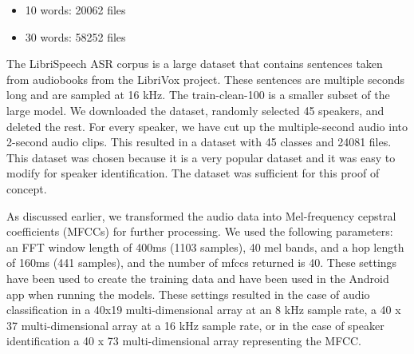 \documentclass{report}
\theoremstyle{definition}
\theoremstyle{remark}
\begin{document}
\begin{itemize}
    \item 10 words: 20062 files
    \item 30 words: 58252 files
\end{itemize}


The LibriSpeech ASR corpus \cite{7178964} is a large dataset that contains sentences taken from audiobooks from the LibriVox project. These sentences are multiple seconds long and are sampled at 16 kHz. The train-clean-100 is a smaller subset of the large model. We downloaded the dataset, randomly selected 45 speakers, and deleted the rest. For every speaker, we have cut up the multiple-second audio into 2-second audio clips. This resulted in a dataset with 45 classes and 24081 files. This dataset was chosen because it is a very popular dataset and it was easy to modify for speaker identification. The dataset was sufficient for this proof of concept.

As discussed earlier, we transformed the audio data into Mel-frequency cepstral coefficients (MFCCs) for further processing. We used the following parameters: an FFT window length of  400ms (1103 samples), 40 mel bands, and a hop length of 160ms (441 samples), and the number of mfccs returned is 40. These settings have been used to create the training data and have been used in the Android app when running the models. These settings resulted in the case of audio classification in a 40x19 multi-dimensional array at an 8 kHz sample rate, a 40 x 37 multi-dimensional array at a 16 kHz sample rate, or in the case of speaker identification a 40 x 73 multi-dimensional array representing the MFCC.
\end{document}
